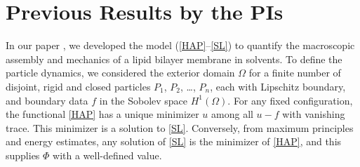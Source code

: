 \section{Previous Results by the PIs}
\label{sec:results}

In our paper \cite{Fu2018_SIAM}, we developed the model (\ref{HAP}--\ref{SL})
to quantify the macroscopic assembly and mechanics of a lipid bilayer membrane in solvents. 
To define the particle dynamics, we considered the exterior domain $\Omega$
for a finite number of disjoint, rigid and closed particles $P_1$, $P_2$, \dots, $P_n$, each with Lipschitz boundary,
and boundary data $f$ in the Sobolev space $H^1(\Omega).$ 
For any fixed configuration, the functional \eqref{HAP} has a unique minimizer $u$
among all $u - f$ with vanishing trace. This minimizer is a solution to \eqref{SL}.
Conversely, from maximum principles and energy estimates,  any solution of 
\eqref{SL} is the minimizer of \eqref{HAP}, and this supplies $\Phi$ with a well-defined value.

